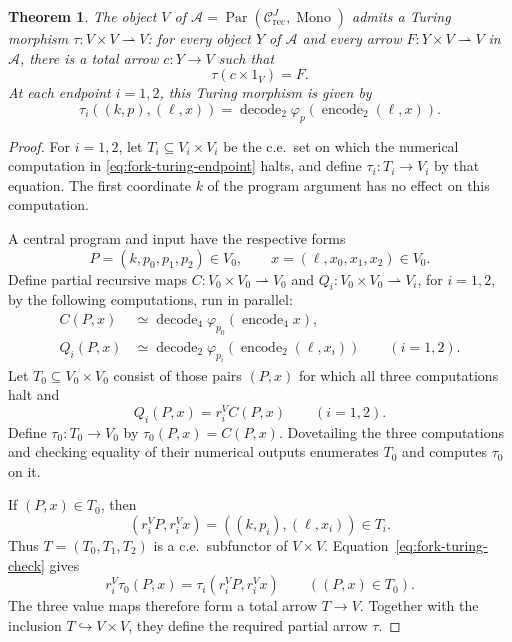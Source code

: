 \documentclass[11pt]{article}
\newtheorem{theorem}{Theorem}[section]
\begin{document}
\begin{theorem}\label{thm:fork-turing}
The object $V$ of
$\mathcal A=\operatorname{Par}(\mathcal C_{\mathrm{rec}}^J,
\operatorname{Mono})$ admits a Turing morphism
$\tau:V\times V\rightharpoonup V$: for every object $Y$ of
$\mathcal A$ and every arrow $F:Y\times V\rightharpoonup V$
in $\mathcal A$, there is a total arrow
$c:Y\to V$ such that
\[
 \tau(c\times1_V)=F.
\]
At each endpoint $i=1,2$, this Turing morphism is given by
\begin{equation}\label{eq:fork-turing-endpoint}
 \tau_i((k,p),(\ell,x))
 =\operatorname{decode}_2
     \varphi_p(\operatorname{encode}_2(\ell,x)).
\end{equation}
\end{theorem}

\begin{proof}
For $i=1,2$, let $T_i\subseteq V_i\times V_i$ be the c.e.\ set
on which the numerical computation in
\eqref{eq:fork-turing-endpoint} halts, and define
$\tau_i:T_i\to V_i$ by that equation. The first coordinate $k$
of the program argument has no effect on this computation.

A central program and input have the respective forms
\[
 P=(k,p_0,p_1,p_2)\in V_0,
 \qquad x=(\ell,x_0,x_1,x_2)\in V_0.
\]
Define partial recursive maps
$C:V_0\times V_0\rightharpoonup V_0$ and
$Q_i:V_0\times V_0\rightharpoonup V_i$, for $i=1,2$,
by the following computations, run in parallel:
\begin{align*}
 C(P,x)&\simeq
   \operatorname{decode}_4
      \varphi_{p_0}(\operatorname{encode}_4 x),\\
 Q_i(P,x)&\simeq
   \operatorname{decode}_2
      \varphi_{p_i}(\operatorname{encode}_2(\ell,x_i))
      \qquad(i=1,2).
\end{align*}
Let $T_0\subseteq V_0\times V_0$ consist of those pairs $(P,x)$
for which all three computations halt and
\begin{equation}\label{eq:fork-turing-check}
 Q_i(P,x)=r_i^V C(P,x)\qquad(i=1,2).
\end{equation}
Define $\tau_0:T_0\to V_0$ by $\tau_0(P,x)=C(P,x)$.
Dovetailing the three computations and checking equality of their
numerical outputs enumerates $T_0$ and computes $\tau_0$ on it.

If $(P,x)\in T_0$, then
\[
 (r_i^V P,r_i^V x)=((k,p_i),(\ell,x_i))\in T_i.
\]
Thus $T=(T_0,T_1,T_2)$ is a c.e.\ subfunctor of $V\times V$.
Equation~\eqref{eq:fork-turing-check} gives
\[
 r_i^V\tau_0(P,x)
   =\tau_i(r_i^V P,r_i^V x)
 \qquad((P,x)\in T_0).
\]
The three value maps therefore form a total arrow $T\to V$.
Together with the inclusion $T\hookrightarrow V\times V$,
they define the required partial arrow $\tau$.


\end{proof}
\end{document}
